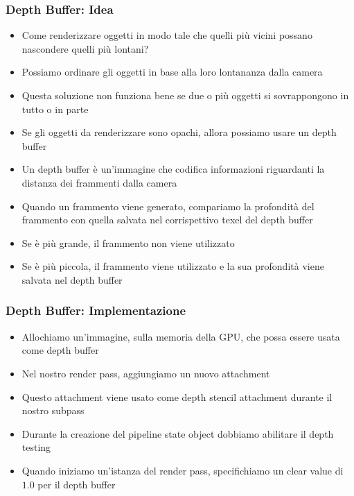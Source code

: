 \begin{frame}
\frametitle{Depth Buffer: Idea}
\begin{itemize}
\item Come renderizzare oggetti in modo tale che quelli più vicini possano nascondere quelli più lontani?
\item Possiamo ordinare gli oggetti in base alla loro lontananza dalla camera
\item Questa soluzione non funziona bene se due o più oggetti si sovrappongono in tutto o in parte
\item Se gli oggetti da renderizzare sono opachi, allora possiamo usare un depth buffer
\item Un depth buffer è un'immagine che codifica informazioni riguardanti la distanza dei frammenti dalla camera
\item Quando un frammento viene generato, compariamo la profondità del frammento con quella salvata nel corrispettivo texel del depth buffer
\item Se è più grande, il frammento non viene utilizzato
\item Se è più piccola, il frammento viene utilizzato e la sua profondità viene salvata nel depth buffer
\end{itemize}
\end{frame}

\begin{frame}
\frametitle{Depth Buffer: Implementazione}
\begin{itemize}
\item Allochiamo un'immagine, sulla memoria della GPU, che possa essere usata come depth buffer
\item Nel nostro render pass, aggiungiamo un nuovo attachment
\item Questo attachment viene usato come depth stencil attachment durante il nostro subpass
\item Durante la creazione del pipeline state object dobbiamo abilitare il depth testing
\item Quando iniziamo un'istanza del render pass, specifichiamo un clear value di $1.0$ per il depth buffer
\end{itemize}
\end{frame}
